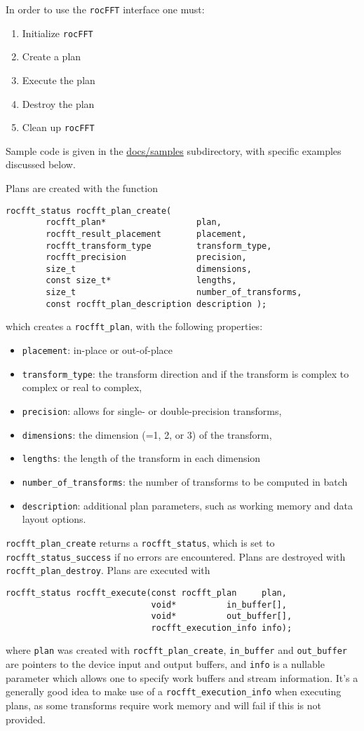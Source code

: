 \documentclass[10pt]{article}
\renewcommand{\(}{\left(}
\renewcommand{\)}{\right)}
\begin{document}
In order to use the \texttt{rocFFT} interface one must:
\begin{enumerate}
\item Initialize \texttt{rocFFT} 
\item Create a plan
\item Execute the plan
\item Destroy the plan
\item Clean up \texttt{rocFFT}
\end{enumerate}
Sample code is given in the \url{docs/samples} subdirectory, with
specific examples discussed below.

Plans are created with the function
\begin{lstlisting}
rocfft_status rocfft_plan_create(
        rocfft_plan*                  plan,
        rocfft_result_placement       placement,
        rocfft_transform_type         transform_type,
        rocfft_precision              precision,
        size_t                        dimensions,
        const size_t*                 lengths,
        size_t                        number_of_transforms,
        const rocfft_plan_description description );
\end{lstlisting}
which creates a \lstinline{rocfft_plan}, with the following properties:
\begin{itemize}
\item \lstinline{placement}: in-place or out-of-place
\item \lstinline{transform_type}: the transform
  direction and if the transform is complex to complex or real to complex,
\item \lstinline{precision}: allows for single- or
  double-precision transforms,
\item \lstinline{dimensions}: the dimension (=1, 2, or 3) of the
  transform,
\item \lstinline{lengths}: the length of the transform in each dimension
\item \lstinline{number_of_transforms}: the number of transforms to be
  computed in batch
\item \lstinline{description}: additional plan parameters, such as
  working memory and data layout options.
\end{itemize}
\lstinline{rocfft_plan_create} returns a \lstinline{rocfft_status},
which is set to \lstinline{rocfft_status_success} if no errors are
encountered.  Plans are destroyed with
\lstinline{rocfft_plan_destroy}.  Plans are executed with
\begin{lstlisting}
rocfft_status rocfft_execute(const rocfft_plan     plan,
                             void*          in_buffer[],
                             void*          out_buffer[],
                             rocfft_execution_info info);
\end{lstlisting}
where \lstinline{plan} was created with
\lstinline{rocfft_plan_create}, \lstinline{in_buffer} and
\lstinline{out_buffer} are pointers to the device input and output
buffers, and \lstinline{info} is a nullable parameter which allows one
to specify work buffers and stream information.  It's a generally good
idea to make use of a \lstinline{rocfft_execution_info} when executing
plans, as some transforms require work memory and will fail if this is
not provided.
\end{document}
